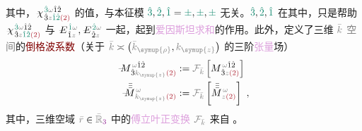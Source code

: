 其中，$\Xint{{}^{}_{\mathcolor{gray}{-}}}{23}{\chi}^{\;\! \textcolor{PineGreen}{\hat{3}} \mathcolor{gray}{\omega} \hat{1} \hat{2} }_{\;\! \hat{3} \mathcolor{gray}{z} \textcolor{PineGreen}{\hat{1} \hat{2}} \textcolor{Maroon}{(2)}}$ 的值，与\textcolor{PineGreen}{本征模} $\textcolor{PineGreen}{\hat{3}},\textcolor{PineGreen}{\hat{2}},\textcolor{PineGreen}{\hat{1}} = \textcolor{PineGreen}{\pm},\textcolor{PineGreen}{\pm},\textcolor{PineGreen}{\pm}$ 无关。$\textcolor{PineGreen}{\hat{3}},\textcolor{PineGreen}{\hat{2}},\textcolor{PineGreen}{\hat{1}}$ 在其中，只是帮助 $\Xint{{}^{}_{\mathcolor{gray}{-}}}{23}{\chi}^{\;\! \textcolor{PineGreen}{\hat{3}} \mathcolor{gray}{\omega} \hat{1} \hat{2} }_{\;\! \hat{3} \mathcolor{gray}{z} \textcolor{PineGreen}{\hat{1} \hat{2}} \textcolor{Maroon}{(2)}}$ 与 $\Xint{\mathcolor{gray}{-}}{25}{E}^{\;\!\textcolor{PineGreen}{\hat{1}} \mathcolor{gray}{\omega}}_{\;\! \hat{1} \mathcolor{gray}{z}}, \Xint{\mathcolor{gray}{-}}{25}{E}^{\;\!\textcolor{PineGreen}{\hat{2}} \mathcolor{gray}{\omega}}_{\;\! \hat{2} \mathcolor{gray}{z}}$ 一起，起到\textcolor{Plum}{爱因斯坦求和}的作用。此外，定义了三维 $\mathcolor{gray}{\bar{k}}$ \textcolor{gray}{空间}的\textcolor{Maroon}{倒格波系数}（关于 $\mathcolor{gray}{\bar{k}} \asymp \left( \mathcolor{gray}{\bar{k}_{\symup{\rho}}}, \mathcolor{gray}{k_{\symup{z}}} \right)$ 的三阶\textcolor{Plum}{张量}\textcolor{NavyBlue}{场}）
\begin{subequations} \label{eq:C}
\begin{align}
	\Xint{\mathcolor{gray}{-}}{18}{M}^{\;\! \mathcolor{gray}{\omega} \hat{1} \hat{2} }_{\;\! \hat{3} \mathcolor{gray}{k_{\symup{z}}} \textcolor{Maroon}{(2)} } &:= \mathcolor{gray}{\mathcal F_{\bar{k}}} \left[ M^{\;\! \mathcolor{gray}{\omega} \hat{1} \hat{2} }_{\;\! \hat{3} \mathcolor{gray}{z} \textcolor{Maroon}{(2)} } \right] \label{eq:vec-C} \\
	\Xint{\mathcolor{gray}{-}}{18}{\bar{\bar{\bar{M}}}}^{\;\! \mathcolor{gray}{\omega} }_{\;\! \mathcolor{gray}{k_{\symup{z}}} \textcolor{Maroon}{(2)} } &:= \mathcolor{gray}{\mathcal F_{\bar{k}}} \left[ \bar{\bar{\bar{M}}}^{\;\! \mathcolor{gray}{\omega} }_{\;\! \mathcolor{gray}{z} \textcolor{Maroon}{(2)} } \right] ~, \label{eq:components-C}
\end{align}
\end{subequations}
其中，三维空域 $\mathcolor{gray}{\bar{r}} \in \mathcolor{gray}{\bar{\mathbb{R}}_{\textcolor{Plum}{3}}}$ 中的\textcolor{Plum}{傅立叶正变换} $\mathcolor{gray}{\mathcal F_{\bar{k}}}$ 来自 。

